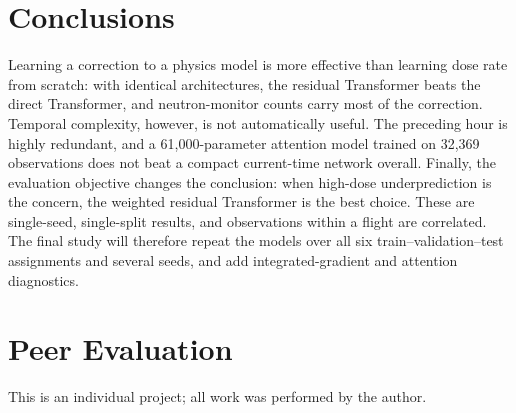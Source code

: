 \documentclass[10pt,twocolumn,letterpaper]{article}
\begin{document}
\section{Conclusions}
\label{sec:conclusions}

Learning a correction to a physics model is more effective than learning dose
rate from scratch: with identical architectures, the residual Transformer
beats the direct Transformer, and neutron-monitor counts carry most of the
correction. Temporal complexity, however, is not automatically useful. The
preceding hour is highly redundant, and a 61,000-parameter attention model
trained on 32,369 observations does not beat a compact current-time network
overall. Finally, the evaluation objective changes the conclusion: when
high-dose underprediction is the concern, the weighted residual Transformer is
the best choice. These are single-seed, single-split results, and observations
within a flight are correlated. The final study will therefore repeat the
models over all six train--validation--test assignments and several seeds,
and add integrated-gradient and attention diagnostics.

\section{Peer Evaluation}
This is an individual project; all work was performed by the author.

{\small


}
\end{document}
